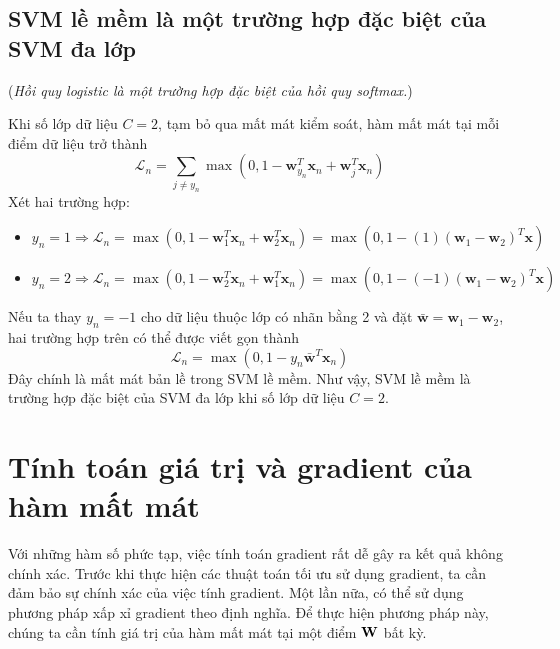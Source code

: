 
\subsection{SVM lề mềm là một trường hợp đặc biệt của SVM đa lớp}
(\textit{Hồi quy logistic là một trường hợp đặc biệt của hồi quy softmax.})

Khi số lớp dữ liệu $C = 2$, tạm bỏ qua mất mát kiểm soát, hàm mất mát tại mỗi điểm dữ liệu trở thành
\begin{equation}
\mathcal{L}_n = \sum_{j \neq y_n} \max(0, 1 - \mathbf{w}_{y_n}^T \mathbf{x}_n + \mathbf{w}_j^T\mathbf{x}_n)
\end{equation}
Xét hai trường hợp:
\begin{itemize}
\item $y_n = 1 \Rightarrow \mathcal{L}_n = \max(0, 1 - \mathbf{w}_1^T\mathbf{x}_n + \mathbf{w}_2^T\mathbf{x}_n) = \max(0, 1 - (1)(\mathbf{w}_1 - \mathbf{w}_2)^T\mathbf{x})$

\item $y_n = 2 \Rightarrow \mathcal{L}_n = \max(0, 1 - \mathbf{w}_2^T\mathbf{x}_n + \mathbf{w}_1^T\mathbf{x}_n) = \max(0, 1 - (-1)(\mathbf{w}_1 - \mathbf{w}_2)^T\mathbf{x})$
\end{itemize}
Nếu ta thay $y_n = -1$ cho dữ liệu thuộc lớp có nhãn bằng 2 và đặt
$\mathbf{\bar{w}} = \mathbf{w}_1 - \mathbf{w}_2$, hai trường hợp trên có thể được viết gọn thành
\begin{equation*}
\mathcal{L}_n = \max(0, 1 - y_n\mathbf{\bar{w}}^T\mathbf{x}_n)
\end{equation*}
Đây chính là mất mát bản lề trong SVM lề mềm. Như vậy, SVM lề mềm là trường hợp đặc biệt của SVM đa lớp khi số lớp dữ liệu $C = 2$.

\section{Tính toán giá trị và gradient của hàm mất mát}
\label{sec:22_3}
Với những hàm số phức tạp, việc tính toán gradient rất dễ gây ra kết quả không
chính xác. Trước khi thực hiện các thuật toán tối ưu sử dụng gradient, ta cần
đảm bảo sự chính xác của việc tính gradient. Một lần nữa, có thể sử dụng phương pháp xấp xỉ gradient theo định nghĩa. Để thực hiện phương pháp này, chúng ta
cần tính giá trị của hàm mất mát tại một điểm $\mathbf{W}$ bất kỳ.

